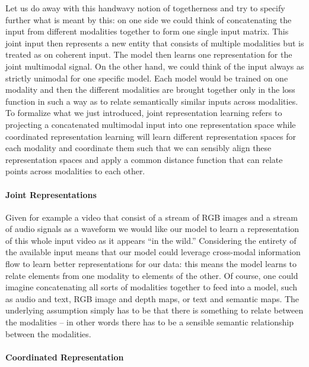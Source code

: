 \documentclass[
]{krantz}
\begin{document}
Let us do away with this handwavy notion of togetherness and try to specify further what is meant by this: on one side we could think of concatenating the input from different modalities together to form one single input matrix. This joint input then represents a new entity that consists of multiple modalities but is treated as on coherent input. The model then learns one representation for the joint multimodal signal. On the other hand, we could think of the input always as strictly unimodal for one specific model. Each model would be trained on one modality and then the different modalities are brought together only in the loss function in such a way as to relate semantically similar inputs across modalities. To formalize what we just introduced, joint representation learning refers to projecting a concatenated multimodal input into one representation space while coordinated representation learning will learn different representation spaces for each modality and coordinate them such that we can sensibly align these representation spaces and apply a common distance function that can relate points across modalities to each other.

\hypertarget{joint-representations}{%
\paragraph{Joint Representations}\label{joint-representations}}

Given for example a video that consist of a stream of RGB images and a stream of audio signals as a waveform we would like our model to learn a representation of this whole input video as it appears ``in the wild.'' Considering the entirety of the available input means that our model could leverage cross-modal information flow to learn better representations for our data: this means the model learns to relate elements from one modality to elements of the other. Of course, one could imagine concatenating all sorts of modalities together to feed into a model, such as audio and text, RGB image and depth maps, or text and semantic maps. The underlying assumption simply has to be that there is something to relate between the modalities -- in other words there has to be a sensible semantic relationship between the modalities.

\hypertarget{coordinated-representation}{%
\paragraph{Coordinated Representation}\label{coordinated-representation}}
\end{document}
